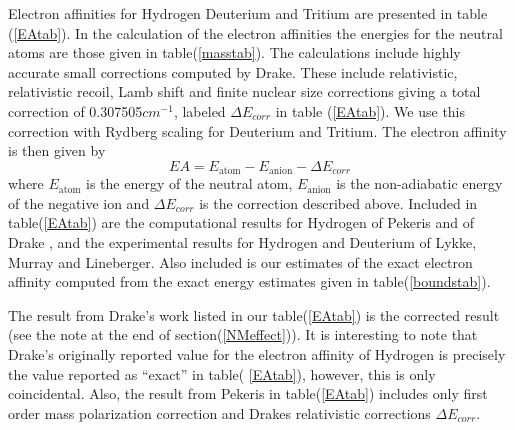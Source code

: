 \documentclass[12pt,thmsa]{article}
\begin{document}
Electron affinities for Hydrogen Deuterium and Tritium are presented in
table (\ref{EAtab}). In the calculation of the electron affinities the
energies for the neutral atoms are those given in table(\ref{masstab}). The
calculations include highly accurate small corrections computed by Drake\cite
{Drake88}. These include relativistic, relativistic recoil, Lamb shift and
finite nuclear size corrections giving a total correction of 0.307505$cm^{-1}
$,  labeled  $\Delta E_{corr}$ in table (\ref{EAtab}). We use this
correction with Rydberg scaling for Deuterium and Tritium. The electron
affinity is then given by 
\begin{equation}
EA=E_{\text{atom}}-E_{\text{anion}}-\Delta E_{corr}
\end{equation}
where $E_{\text{atom}}$ is the energy of the neutral atom, $E_{\text{anion}}$
is the non-adiabatic energy of the negative ion and $\Delta E_{corr}$ is the
correction described above. Included in table(\ref{EAtab}) are the
computational results for Hydrogen of Pekeris\cite{Pekeris62} and of Drake%
\cite{Drake88}, and the experimental results for Hydrogen and Deuterium of
Lykke, Murray and Lineberger\cite{Lykke91}. Also included is our estimates
of the exact electron affinity computed from the exact energy estimates
given in table(\ref{boundstab}).

The result from Drake's work listed in our table(\ref{EAtab}) is the
corrected result (see the note at the end of section(\ref{NMeffect})). It is
interesting to note that Drake's originally reported value for the electron
affinity of Hydrogen is precisely the value reported as ``exact'' in table(%
\ref{EAtab}), however, this is only coincidental. Also, the result from
Pekeris in table(\ref{EAtab}) includes only first order mass polarization
correction and Drakes relativistic corrections $\Delta E_{corr}.$ 
\end{document}
